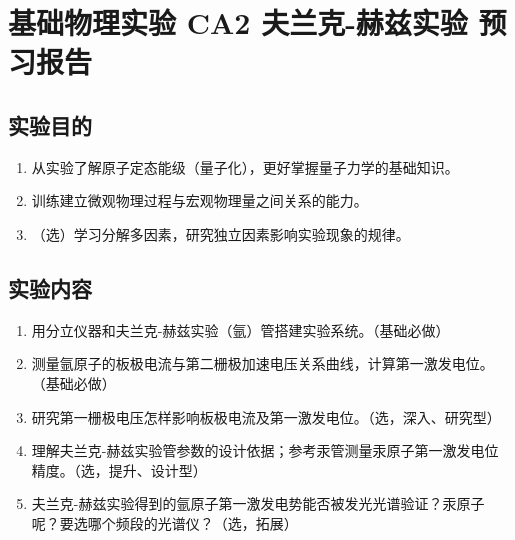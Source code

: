 \documentclass[dvipsnames, svgnames,a4paper,11pt]{article}
\begin{document}
\clearpage

\setcounter{section}{0}
\section{基础物理实验  \quad CA2 夫兰克-赫兹实验  \heiti 预习报告}

	
\subsection{实验目的}
\begin{enumerate}
	\item 从实验了解原子定态能级（量子化），更好掌握量子力学的基础知识。
	\item 训练建立微观物理过程与宏观物理量之间关系的能力。
	\item （选）学习分解多因素，研究独立因素影响实验现象的规律。
\end{enumerate}

\subsection{实验内容}
\begin{enumerate}
	\item 用分立仪器和夫兰克-赫兹实验（氩）管搭建实验系统。（基础必做）
	\item 测量氩原子的板极电流与第二栅极加速电压关系曲线，计算第一激发电位。（基础必做）
	\item 研究第一栅极电压怎样影响板极电流及第一激发电位。（选，深入、研究型）
	\item 理解夫兰克-赫兹实验管参数的设计依据；参考汞管测量汞原子第一激发电位精度。（选，提升、设计型）
	\item 夫兰克-赫兹实验得到的氩原子第一激发电势能否被发光光谱验证？汞原子呢？要选哪个频段的光谱仪？（选，拓展）
\end{enumerate}
\end{document}
